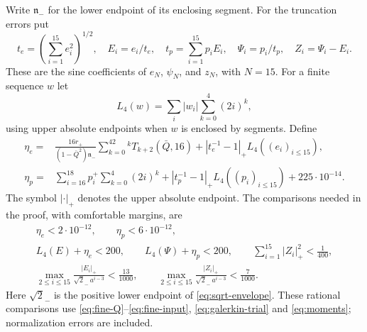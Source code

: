 \documentclass[a4paper,11pt]{article}
\numberwithin{equation}{section}
\theoremstyle{definition}
\theoremstyle{remark}
\begin{document}
Write $\mathfrak n_-$ for the lower endpoint of its enclosing segment. For the truncation errors put
\[
 t_e=\left(\sum_{i=1}^{15}e_i^2\right)^{1/2},\quad
 E_i=e_i/t_e,\quad t_p=\sum_{i=1}^{15}p_iE_i,\quad
 \Psi_i=p_i/t_p,\quad Z_i=\Psi_i-E_i.
\]
These are the sine coefficients of $e_N$, $\psi_N$, and $z_N$, with $N=15$. For a finite sequence $w$ let
\[
 L_4(w)=\sum_i |w_i|\sum_{k=0}^4(2i)^k,
\]
using upper absolute endpoints when $w$ is enclosed by segments. Define
\begin{align}
 \eta_e={}&\frac{16r_+}{(1-\bar Q^2)\mathfrak n_-}
 \sum_{k=0}^42^kT_{k+2}(\bar Q,16)
 +|t_e^{-1}-1|_+L_4((e_i)_{i\le15}),\label{eq:eta-e}\\
 \eta_p={}&\sum_{i=16}^{18}p_i^+\sum_{k=0}^4(2i)^k
 +|t_p^{-1}-1|_+L_4((p_i)_{i\le15})+225\cdot10^{-14}.
 \label{eq:eta-p}
\end{align}
The symbol $|\cdot|_+$ denotes the upper absolute endpoint. The comparisons needed in the proof, with comfortable margins, are
\begin{equation}\label{eq:vector-scalar-checks}
\begin{gathered}
 \eta_e<2\cdot10^{-12},\qquad \eta_p<6\cdot10^{-12},\\
 L_4(E)+\eta_e<200,
 \qquad L_4(\Psi)+\eta_p<200,
 \qquad\sum_{i=1}^{15}|Z_i|_+^2<\tfrac1{400},\\
 \max_{2\le i\le15}\frac{|E_i|_+}{\sqrt2_-\,a^{i-3}}<\tfrac{13}{1000},
 \qquad
 \max_{2\le i\le15}\frac{|Z_i|_+}{\sqrt2_-\,a^{i-3}}<\tfrac7{1000}.
\end{gathered}
\end{equation}
Here $\sqrt2_-$ is the positive lower endpoint of \eqref{eq:sqrt-envelope}. These rational comparisons use \eqref{eq:fine-Q}--\eqref{eq:fine-input}, \eqref{eq:galerkin-trial} and \eqref{eq:moments}; normalization errors are included.
\end{document}
